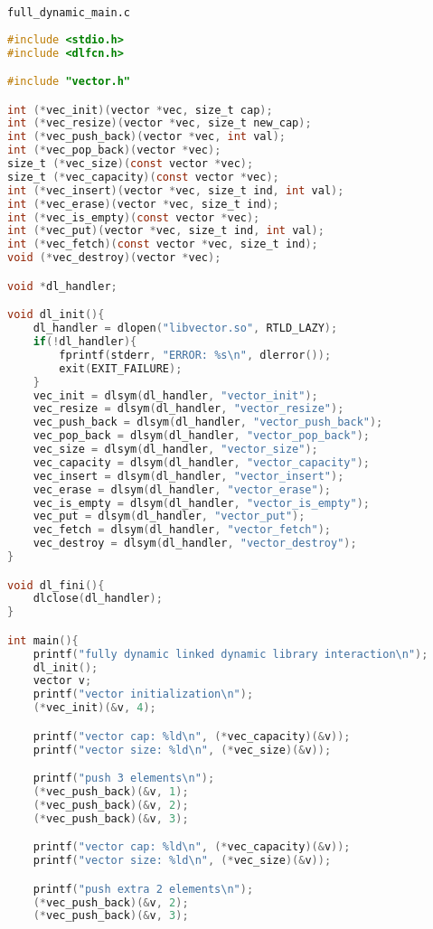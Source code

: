 \documentclass[12pt]{article}
\begin{document}
\verb|full_dynamic_main.c|
\begin{lstlisting}[language=C, basicstyle=\scriptsize]
#include <stdio.h>
#include <dlfcn.h>

#include "vector.h"

int (*vec_init)(vector *vec, size_t cap);
int (*vec_resize)(vector *vec, size_t new_cap);
int (*vec_push_back)(vector *vec, int val);
int (*vec_pop_back)(vector *vec);
size_t (*vec_size)(const vector *vec);
size_t (*vec_capacity)(const vector *vec);
int (*vec_insert)(vector *vec, size_t ind, int val);
int (*vec_erase)(vector *vec, size_t ind);
int (*vec_is_empty)(const vector *vec);
int (*vec_put)(vector *vec, size_t ind, int val);
int (*vec_fetch)(const vector *vec, size_t ind);
void (*vec_destroy)(vector *vec);

void *dl_handler;

void dl_init(){
    dl_handler = dlopen("libvector.so", RTLD_LAZY);
    if(!dl_handler){
        fprintf(stderr, "ERROR: %s\n", dlerror());
        exit(EXIT_FAILURE);
    }
    vec_init = dlsym(dl_handler, "vector_init");
    vec_resize = dlsym(dl_handler, "vector_resize");
    vec_push_back = dlsym(dl_handler, "vector_push_back");
    vec_pop_back = dlsym(dl_handler, "vector_pop_back");
    vec_size = dlsym(dl_handler, "vector_size");
    vec_capacity = dlsym(dl_handler, "vector_capacity");
    vec_insert = dlsym(dl_handler, "vector_insert");
    vec_erase = dlsym(dl_handler, "vector_erase");
    vec_is_empty = dlsym(dl_handler, "vector_is_empty");
    vec_put = dlsym(dl_handler, "vector_put");
    vec_fetch = dlsym(dl_handler, "vector_fetch");
    vec_destroy = dlsym(dl_handler, "vector_destroy");
}

void dl_fini(){
    dlclose(dl_handler);
}

int main(){
    printf("fully dynamic linked dynamic library interaction\n");
    dl_init();
    vector v;
    printf("vector initialization\n");
    (*vec_init)(&v, 4);

    printf("vector cap: %ld\n", (*vec_capacity)(&v));
    printf("vector size: %ld\n", (*vec_size)(&v));

    printf("push 3 elements\n");
    (*vec_push_back)(&v, 1);
    (*vec_push_back)(&v, 2);
    (*vec_push_back)(&v, 3);

    printf("vector cap: %ld\n", (*vec_capacity)(&v));
    printf("vector size: %ld\n", (*vec_size)(&v));

    printf("push extra 2 elements\n");
    (*vec_push_back)(&v, 2);
    (*vec_push_back)(&v, 3);


\end{lstlisting}
\end{document}
